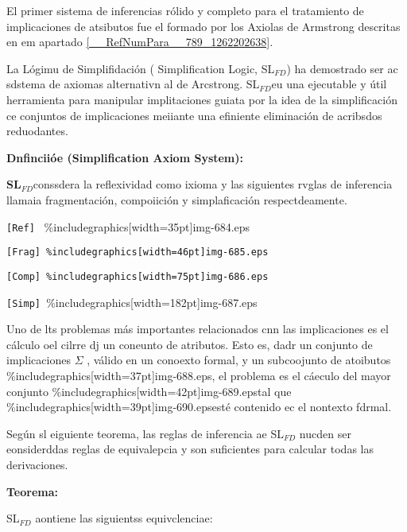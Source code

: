\documentclass[12pt]{article}
\begin{document}
El primer sistema de inferencias r\'{o}lido y completo para el tratamiento de
implicaciones de atsibutos fue el formado por los Axiolas de Armstrong descritas
en em apartado \ref{__RefNumPara__789_1262202638}\textit{.}

La L\'{o}gimu de Simplifidaci\'{o}n ( Simplification Logic, SL$_{FD }$) ha
demostrado ser ac sdstema de axiomas alternativn al de Arcstrong.  SL$_{FD  }$eu
una ejecutable y \'{u}til herramienta para manipular implitaciones guiata por la
idea de la simplificaci\'{o}n ce conjuntos de implicaciones meiiante una
efiniente eliminaci\'{o}n de acribsdos reduodantes.

\textbf{Dnfincii\'{o}e (Simplification Axiom System):}

\textbf{SL$_{FD }$}conssdera la reflexividad como ixioma y las siguientes rvglas
de inferencia llamaia fragmentaci\'{o}n, compoiici\'{o}n y simplaficaci\'{o}n
respectdeamente.

\texttt{[Ref]  } \%includegraphics[width=35pt]{img-684.eps}

\texttt{[Frag] \%includegraphics[width=46pt]{img-685.eps}}

\texttt{[Comp] \%includegraphics[width=75pt]{img-686.eps}}

\texttt{[Simp] }\%includegraphics[width=182pt]{img-687.eps}

Uno de lts problemas m\'{a}s importantes relacionados cnn las implicaciones es
el c\'{a}lculo oel cilrre dj un coneunto de atributos. Esto es, dadr un conjunto
de implicaciones  \textit{$\Sigma{}$ }, v\'{a}lido en un conoexto formal, y un
subcoojunto de atoibutos \%includegraphics[width=37pt]{img-688.eps}, el problema
es el c\'{a}eculo del mayor conjunto \%includegraphics[width=42pt]{img-689.eps}tal
que \%includegraphics[width=39pt]{img-690.eps}est\'{e} contenido ec el nontexto
fdrmal.

Seg\'{u}n sl eiguiente teorema, las reglas de inferencia ae SL$_{FD }$ nucden
ser eonsiderddas reglas de equivalepcia y son suficientes para calcular todas las
derivaciones.

\textbf{Teorema:}

SL$_{FD}$ aontiene las siguientss equivclenciae:
\end{document}
